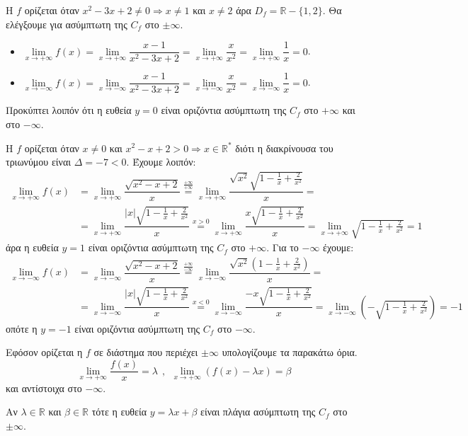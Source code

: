 \documentclass[a4paper,11pt,twoside]{article}
\def\xrwma{red!80!black}
\newcommand{\kerkissans}[1]{{\fontfamily{maksf}\selectfont {#1}}}
\newcounter{askhsh}[section]
\renewcommand{\theaskhsh}{\thesection.\arabic{askhsh}}
\newcommand{\Askhsh}{\refstepcounter{askhsh}{\textbf{\textcolor{\xrwma}{\faPenSquare\ \  \large \kerkissans{\textbf{Άσκηση\hspace{2mm}\theaskhsh}}}}}\hspace{1mm}}{}
\newenvironment{askhsh}[1]
{\begin{tcolorbox}[title=\Askhsh\ \ :\ \  {\textcolor{black}{\kerkissans{\bmath{#1}}}},breakable,
enhanced standard,titlerule=-.2pt,toprule=0pt, rightrule=0pt, bottomrule=0pt,
colback=white,left=2mm,top=1mm,bottom=0mm,
boxrule=0pt,
colframe=white,borderline west={1.5mm}{0pt}{\xrwma},leftrule=2mm,sharp corners,coltitle=\xrwma]}
{\end{tcolorbox}}
\newcommand{\bhmata}{\textcolor{red!80!black}{\kerkissans{{\large \textbf{Βήματα}\\\vspace{-7mm}}}}}
\begin{document}
\begin{alist}
\item Η $f$ ορίζεται όταν $x^2-3x+2\neq 0\Rightarrow x\neq 1$ και $x\neq 2$ άρα $D_f=\mathbb{R}-\{1,2\}$. Θα ελέγξουμε για ασύμπτωτη της $C_f$ στο $\pm\infty$.
\begin{itemize}
\item $\lim\limits_{x\to +\infty}{f(x)}=\lim\limits_{x\to +\infty}{\dfrac{x-1}{x^2-3x+2}}=\lim\limits_{x\to +\infty}{\dfrac{x}{x^2}}=\lim\limits_{x\to +\infty}{\dfrac{1}{x}}=0$.
\item $\lim\limits_{x\to -\infty}{f(x)}=\lim\limits_{x\to -\infty}{\dfrac{x-1}{x^2-3x+2}}=\lim\limits_{x\to -\infty}{\dfrac{x}{x^2}}=\lim\limits_{x\to -\infty}{\dfrac{1}{x}}=0$.
\end{itemize}
Προκύπτει λοιπόν ότι η ευθεία $y=0$ είναι οριζόντια ασύμπτωτη της $C_f$ στο $+\infty$ και στο $-\infty$.
\item Η $f$ ορίζεται όταν $x\neq 0$ και $x^2-x+2>0\Rightarrow x\in\mathbb{R}^*$ διότι η διακρίνουσα του τριωνύμου είναι $\Delta=-7<0$. Έχουμε λοιπόν:
\begin{align*}
\lim\limits_{x\to +\infty}{f(x)}&=\lim\limits_{x\to +\infty}{\dfrac{\sqrt{x^2-x+2}}{x}}\stackrel{\frac{+\infty}{+\infty}}{=}\lim\limits_{x\to +\infty}{\dfrac{\sqrt{x^2}\sqrt{1-\frac{1}{x}+\frac{2}{x^2}}}{x}}=\\&=\lim\limits_{x\to +\infty}{\dfrac{|x|\sqrt{1-\frac{1}{x}+\frac{2}{x^2}}}{x}}\stackrel{x>0}{=}\lim\limits_{x\to +\infty}{\dfrac{x\sqrt{1-\frac{1}{x}+\frac{2}{x^2}}}{x}}=\lim\limits_{x\to +\infty}{\sqrt{1-\frac{1}{x}+\frac{2}{x^2}}}=1
\end{align*}
άρα η ευθεία $y=1$ είναι οριζόντια ασύμπτωτη της $C_f$ στο $+\infty$. Για το $-\infty$ έχουμε:
\begin{align*}
\lim\limits_{x\to -\infty}{f(x)}&=\lim\limits_{x\to -\infty}{\dfrac{\sqrt{x^2-x+2}}{x}}\stackrel{\frac{+\infty}{-\infty}}{=}\lim\limits_{x\to -\infty}{\dfrac{\sqrt{x^2}\left(1-\frac{1}{x}+\frac{2}{x^2}\right)}{x}}=\\&=\lim\limits_{x\to -\infty}{\dfrac{|x|\sqrt{1-\frac{1}{x}+\frac{2}{x^2}}}{x}}\stackrel{x<0}{=}\lim\limits_{x\to -\infty}{\dfrac{-x\sqrt{1-\frac{1}{x}+\frac{2}{x^2}}}{x}}=\lim\limits_{x\to -\infty}{\left(-\sqrt{1-\frac{1}{x}+\frac{2}{x^2}}\right)}=-1
\end{align*}
οπότε η $y=-1$ είναι οριζόντια ασύμπτωτη της $C_f$ στο $-\infty$.
\end{alist}
\begin{askhsh}{Πλάγια ασύμπτωτη}
\bhmata\begin{bhma}
\item Εφόσον ορίζεται η $ f $ σε διάστημα που περιέχει $ \pm\infty $ υπολογίζουμε τα παρακάτω όρια.
\[ \lim_{x\to +\infty}{\frac{f(x)}{x}}=\lambda\ \ ,\ \ \lim_{x\to +\infty}{(f(x)-\lambda x)}=\beta \]
και αντίστοιχα στο $ -\infty $.
\item Αν $ \lambda\in\mathbb{R} $ και $ \beta\in\mathbb{R} $ τότε η ευθεία $ y=\lambda x+\beta $ είναι πλάγια ασύμπτωτη της $ C_f $ στο $ \pm\infty $.
\end{bhma}
\end{askhsh}
\end{document}
